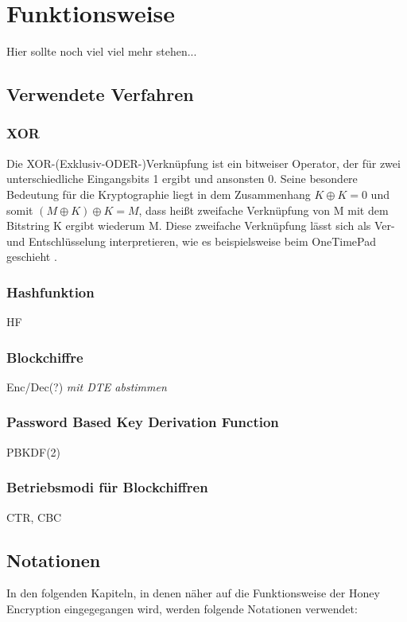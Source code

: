 \section{Funktionsweise}
\label{sec:funktionsweise}

Hier sollte noch viel viel mehr stehen...

\subsection{Verwendete Verfahren}

\subsubsection{XOR}
Die XOR-(Exklusiv-ODER-)Verknüpfung ist ein bitweiser Operator, der für zwei unterschiedliche Eingangsbits 1 ergibt und ansonsten 0. Seine besondere Bedeutung für die Kryptographie liegt in dem Zusammenhang \(K \oplus K = 0\) und somit \((M \oplus K) \oplus K = M\), dass heißt zweifache Verknüpfung von M mit dem Bitstring K ergibt wiederum M. Diese zweifache Verknüpfung lässt sich als Ver- und Entschlüsselung interpretieren, wie es beispielsweise beim OneTimePad geschieht \cite{Schneier2006}.%

\subsubsection{Hashfunktion}
HF

\subsubsection{Blockchiffre}
Enc/Dec(?) \textit{mit DTE abstimmen}

\subsubsection{Password Based Key Derivation Function}
PBKDF(2)

\subsubsection{Betriebsmodi für Blockchiffren}
CTR, CBC

\subsection{Notationen}

In den folgenden Kapiteln, in denen näher auf die Funktionsweise der Honey Encryption eingegegangen wird, werden folgende Notationen verwendet:


